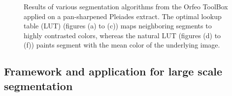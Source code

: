 \documentclass{josis}
\begin{document}
\begin{figure}[!htb]
\quad
{}
\quad
{}
\caption{Results of various segmentation algorithms from the Orfeo ToolBox
  applied on a pan-sharpened Pleiades extract. The optimal lookup table (LUT) (figures
  (a) to (c)) maps
  neighboring segments to highly contrasted colors, whereas the
  natural LUT (figures
  (d) to (f)) paints segment with the mean color of the underlying image.}\label{fig:segalgs}
\end{figure}


\subsection{Framework and application for large scale segmentation}
\end{document}
